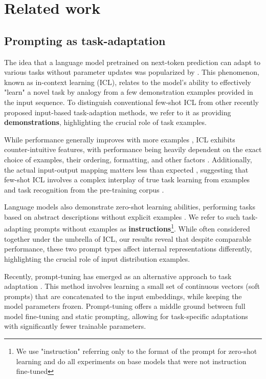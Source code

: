 \section{Related work}
\subsection{Prompting as task-adaptation}

The idea that a language model pretrained on next-token prediction can adapt to various tasks without parameter updates was popularized by \cite{brown2020languagemodelsfewshotlearners}. This phenomenon, known as in-context learning (ICL), relates to the model's ability to effectively "learn" a novel task by analogy from a few demonstration examples provided in the input sequence. To distinguish conventional few-shot ICL from other recently proposed input-based task-adaption methods, we refer to it as providing \textbf{demonstrations}, highlighting the crucial role of task examples.

While performance generally improves with more examples \cite{brown2020languagemodelsfewshotlearners, bertsch2024incontextlearninglongcontextmodels}, ICL exhibits counter-intuitive features, with performance being heavily dependent on the exact choice of examples, their ordering, formatting, and other factors \cite{zhao2021calibrateuseimprovingfewshot, wang2024largelanguagemodelslatent, liu2024understandingincontextlearningcontrastive}. Additionally, the actual input-output mapping matters less than expected \cite{min2022rethinkingroledemonstrationsmakes}, suggesting that few-shot ICL involves a complex interplay of true task learning from examples and task recognition from the pre-training corpus \cite{pan2023incontextlearninglearnsincontext}.

Language models also demonstrate zero-shot learning abilities, performing tasks based on abstract descriptions without explicit examples \cite{Radford2019LanguageMA, wei2022finetunedlanguagemodelszeroshot}. We refer to such task-adapting prompts without examples as \textbf{instructions}\footnote{We use "instruction" referring only to the format of the prompt for zero-shot learning and do all experiments on base models that were not instruction fine-tuned}. While often considered together under the umbrella of ICL, our results reveal that despite comparable performance, these two prompt types affect internal representations differently, highlighting the crucial role of input distribution examples.

Recently, prompt-tuning has emerged as an alternative approach to task adaptation \cite{lester2021powerscaleparameterefficientprompt, liu2022fewshotparameterefficientfinetuningbetter}. This method involves learning a small set of continuous vectors (soft prompts) that are concatenated to the input embeddings, while keeping the model parameters frozen. Prompt-tuning offers a middle ground between full model fine-tuning and static prompting, allowing for task-specific adaptations with significantly fewer trainable parameters.


